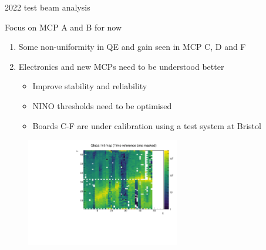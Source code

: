 \documentclass[xcolor={dvipsnames}]{beamer}
\begin{document}
\begin{frame}{2022 test beam analysis}
  \vspace{0.0cm}
  \begin{center}
    {\large Focus on MCP A and B for now}
  \end{center}
  \vspace{0.1cm}
  \begin{enumerate}
    \setlength\itemsep{0.0em}
    \item{Some non-uniformity in QE and gain seen in MCP C, D and F}
    \item{Electronics and new MCPs need to be understood better}
    \begin{itemize}
      \item{Improve stability and reliability}
      \item{NINO thresholds need to be optimised}
      \item{Boards C-F are under calibration using a test system at Bristol}
    \end{itemize}
  \end{enumerate}
  \vspace{-0.04cm}
  \begin{figure}
    \centering
    \includegraphics[width = 0.6\textwidth]{Figs/GlobalHitMap_Run480.pdf}
  \end{figure}
\end{frame}
\end{document}
